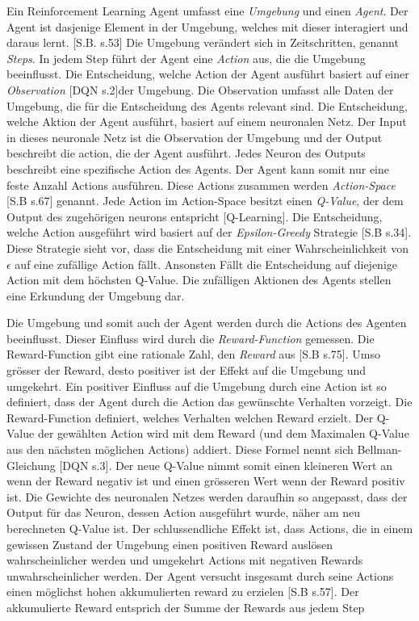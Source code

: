 Ein Reinforcement Learning Agent umfasst eine \emph{Umgebung} und einen
\emph{Agent}. Der Agent ist dasjenige Element in der Umgebung, welches mit
dieser interagiert und daraus lernt. [S.B. s.53] Die Umgebung verändert sich in
Zeitschritten, genannt \emph{Steps}. In jedem Step führt der Agent eine
\emph{Action} aus, die die Umgebung beeinflusst. Die Entscheidung, welche Action
der Agent ausführt basiert auf einer \emph{Observation} [DQN s.2]der Umgebung. Die
Observation umfasst alle Daten der Umgebung, die für die Entscheidung des Agents
relevant sind. Die Entscheidung, welche Aktion der Agent ausführt, basiert auf
einem neuronalen Netz. Der Input in dieses neuronale Netz ist die Observation
der Umgebung und der Output beschreibt die action, die der Agent ausführt. Jedes
Neuron des Outputs beschreibt eine spezifische Action des Agents. Der Agent kann
somit nur eine feste Anzahl Actions ausführen. Diese Actions zusammen werden
\emph{Action-Space} [S.B s.67] genannt. Jede Action im Action-Space besitzt einen
\emph{Q-Value}, der dem Output des zugehörigen neurons entspricht [Q-Learning]. Die
Entscheidung, welche Action ausgeführt wird basiert auf der
\emph{Epsilon-Greedy} Strategie [S.B s.34]. Diese Strategie sieht vor, dass die
Entscheidung mit einer Wahrscheinlichkeit von $\epsilon$ auf eine zufällige
Action fällt. Ansonsten Fällt die Entscheidung auf diejenige Action mit dem
höchsten Q-Value. Die zufälligen Aktionen des Agents stellen eine Erkundung der
Umgebung dar.

Die Umgebung und somit auch der Agent werden durch die Actions des Agenten
beeinflusst. Dieser Einfluss wird durch die \emph{Reward-Function} gemessen. Die
Reward-Function gibt eine rationale Zahl, den \emph{Reward} aus [S.B s.75]. Umso grösser
der Reward, desto positiver ist der Effekt auf die Umgebung und umgekehrt. Ein
positiver Einfluss auf die Umgebung durch eine Action ist so definiert, dass der
Agent durch die Action das gewünschte Verhalten vorzeigt. Die Reward-Function
definiert, welches Verhalten welchen Reward erzielt. Der Q-Value der gewählten
Action wird mit dem Reward (und dem Maximalen Q-Value aus den nächsten möglichen
Actions) addiert. Diese Formel nennt sich Bellman-Gleichung [DQN s.3]. Der neue Q-Value          
nimmt somit einen kleineren Wert an wenn der Reward negativ ist und einen
grösseren Wert wenn der Reward positiv ist. Die Gewichte des neuronalen Netzes
werden daraufhin so angepasst, dass der Output für das Neuron, dessen Action
ausgeführt wurde, näher am neu berechneten Q-Value ist. Der schlussendliche
Effekt ist, dass Actions, die in einem gewissen Zustand der Umgebung einen
positiven Reward auslösen wahrscheinlicher werden und umgekehrt Actions mit
negativen Rewards unwahrscheinlicher werden. Der Agent versucht insgesamt durch
seine Actions einen möglichst hohen akkumulierten reward zu erzielen [S.B s.57]. Der
akkumulierte Reward entsprich der Summe der Rewards aus jedem Step

